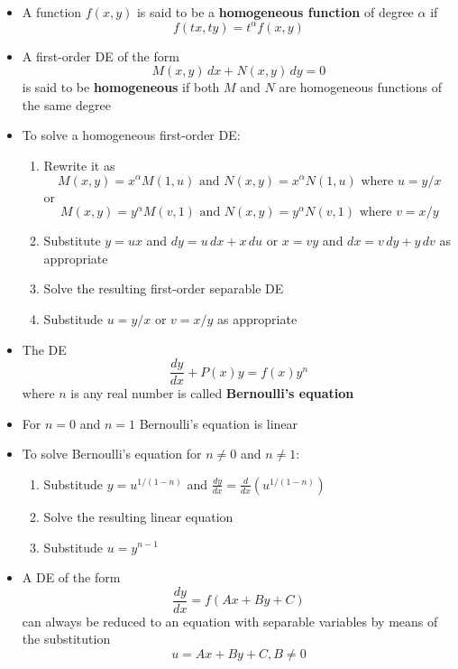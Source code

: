 \documentclass{article}
\begin{document}
\begin{itemize}
  \item A function $f(x, y)$ is said to be a \textbf{homogeneous function} of degree $\alpha$ if \[f(t x, t y) = t^\alpha f(x, y)\]

  \item A first-order DE of the form \[M(x, y) \,d x + N(x, y) \,d y = 0\] is said to be \textbf{homogeneous} if both $M$ and $N$ are homogeneous functions of the same degree

  \item To solve a homogeneous first-order DE:

        \begin{enumerate}
          \item Rewrite it as \[M(x, y) = x^\alpha M(1, u) \text{ and } N(x, y) = x^\alpha N(1, u) \text{ where } u = y / x\] or \[M(x, y) = y^\alpha M(v, 1) \text{ and } N(x, y) = y^\alpha N(v, 1) \text{ where } v = x / y\]

          \item Substitute $y = u x$ and $d y = u \,d x + x \,d u$ or $x = v y$ and $d x = v \,d y + y \,d v$ as appropriate

          \item Solve the resulting first-order separable DE

          \item Substitude $u = y / x$ or $v = x / y$ as appropriate
        \end{enumerate}

  \item The DE \[\frac{d y}{d x} + P(x) y = f(x) y^n\] where $n$ is any real number is called \textbf{Bernoulli's equation}

  \item For $n = 0$ and $n = 1$ Bernoulli's equation is linear

  \item To solve Bernoulli's equation for $n \ne 0$ and $n \ne 1$:

        \begin{enumerate}
          \item Substitude $y = u^{1 / (1 - n)}$ and $\frac{d y}{d x} = \frac{d}{dx} (u^{1 / (1 - n)})$

          \item Solve the resulting linear equation

          \item Substitude $u = y^{n - 1}$
        \end{enumerate}

  \item A DE of the form \[\frac{d y}{d x} = f(A x + B y + C)\] can always be reduced to an equation with separable variables by means of the substitution \[u = A x + B y + C, B \ne 0\]
\end{itemize}
\end{document}
